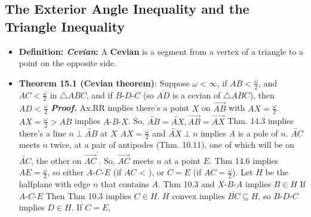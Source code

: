 \documentclass{report}
\begin{document}
    \subsection{The Exterior Angle Inequality and the Triangle Inequality}
    \begin{itemize}
        \item \textbf{Definition: \textit{Cevian}:} A \textbf{Cevian} is a segment from a vertex of a triangle to a point on the opposite side.
            \bigbreak \noindent 
        \item \textbf{Theorem 15.1 (Cevian theorem)}: Suppose $\omega < \infty$, if $AB < \frac{\omega}{2}$, and $AC < \frac{\omega}{2}$ in $\triangle ABC$, and if $ B\text{-}D\text{-}C $ (so $\overline{AD} $ is a cevian of $\triangle ABC$), then $AD < \frac{\omega}{2}$
            \bigbreak \noindent 
            \bigbreak \noindent 
            \bigbreak \noindent 
            \textbf{\textit{Proof.}} Ax.RR implies there's a point $X$ on $\overrightarrow{AB}$ with $AX  = \frac{\omega}{2}$. $AX = \frac{\omega}{2} > AB$ implies $ A\text{-}B\text{-}X$. So, $ \overleftrightarrow{AB} = \overleftrightarrow{AX} , \overrightarrow{AB} = \overrightarrow{AX}$
            \bigbreak \noindent 
            Thm. 14.3 implies there's a line $ n \perp \overleftrightarrow{AB} $ at $X$
            \bigbreak \noindent 
            \bigbreak \noindent 
            $AX =\frac{\omega}{2}$ and $ \overleftrightarrow{AX} \perp n$ implies $A$ is a pole of $n$. $\overleftrightarrow{AC}$ meets $n$ twice, at a pair of antipodes (Thm. 10.11), one of which will be on $\overleftrightarrow{AC}$, the other on $ \overrightarrow{AC}^{\prime}$. So, $\overrightarrow{AC}$ meets $n$ at a point $E$. 
            \bigbreak \noindent 
            Thm 14.6 implies $AE = \frac{\omega}{2}$, so either $ A\text{-}C\text{-}E $ (if $AC$ < ), or $C = E$ (if $AC = \frac{\omega}{2}$).
            \bigbreak \noindent 
            Let $H$ be the halfplane with edge $n$ that contains $A$. Thm 10.3 and $ X\text{-}B\text{-}A $ implies $ B \in H$
            \bigbreak \noindent 
            If $ A\text{-}C\text{-}E $
            \bigbreak \noindent 
            \bigbreak \noindent 
            Then Thm 10.3 implies $ C \in H$. $H$ convex implies $ \overline{BC} \subseteq H $, so $ B\text{-}D\text{-}C$ implies $ D \in H$.
            \bigbreak \noindent 
            If $C = E$, 

\end{itemize}
\end{document}
